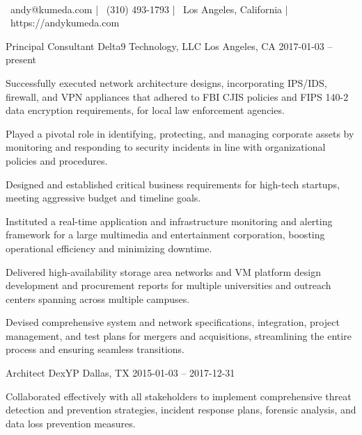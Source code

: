 \documentclass[]{awesome-cv}
\begin{document}
    
\begin{center}
	  \\
	\vspace{2mm}
	{\faEnvelope\ andy@kumeda.com} | {\faMobile\ (310) 493-1793} | {\faMapMarker\ Los Angeles, California} | {\faLink\ https://andykumeda.com}
\end{center}
\begin{cventries}
	\cventry
	{Principal Consultant}
	{Delta9 Technology, LLC}
	{Los Angeles, CA}
	{2017-01-03 – present}
	{\begin{cvitems}
		\item {Successfully executed network architecture designs, incorporating IPS/IDS, firewall, and VPN appliances that adhered to FBI CJIS policies and FIPS 140-2 data encryption requirements, for local law enforcement agencies.}
		\item {Played a pivotal role in identifying, protecting, and managing corporate assets by monitoring and responding to security incidents in line with organizational policies and procedures.}
		\item {Designed and established critical business requirements for high-tech startups, meeting aggressive budget and timeline goals.}
		\item {Instituted a real-time application and infrastructure monitoring and alerting framework for a large multimedia and entertainment corporation, boosting operational efficiency and minimizing downtime.}
		\item {Delivered high-availability storage area networks and VM platform design development and procurement reports for multiple universities and outreach centers spanning across multiple campuses.}
		\item {Devised comprehensive system and network specifications, integration, project management, and test plans for mergers and acquisitions, streamlining the entire process and ensuring seamless transitions.}
		\end{cvitems}}
	\cventry
	{Architect}
	{DexYP}
	{Dallas, TX}
	{2015-01-03 – 2017-12-31}
	{\begin{cvitems}
		\item {Collaborated effectively with all stakeholders to implement comprehensive threat detection and prevention strategies, incident response plans, forensic analysis, and data loss prevention measures.}

\end{cvitems}}
\end{cventries}
\end{document}
